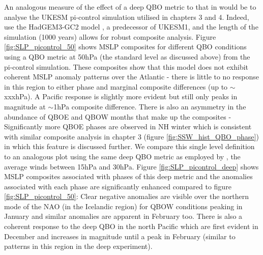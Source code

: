 An analogous measure of the effect of a deep QBO metric to that in \cite{andrewsObserved2019d} would be to analyse the UKESM pi-control simulation utilised in chapters 3 and 4. Indeed, \cite{andrewsObserved2019d} use the HadGEM3-GC2 model \citep{williamsMet2018b}, a predecessor of UKESM1, and the length of the simulation (1000 years) allows for robust composite analysis. Figure \ref{fig:SLP_picontrol_50} shows MSLP composites for different QBO conditions using a QBO metric at 50hPa (the standard level as discussed above) from the pi-control simulation. These composites show that this model does not exhibit coherent MSLP anomaly patterns over the Atlantic - there is little to no response in this region to either phase and marginal composite differences (up to $\sim$xxxhPa). A Pacific response is slightly more evident but still only peaks in magnitude at $\sim$1hPa composite difference. There is also an asymmetry in the abundance of QBOE and QBOW months that make up the composites - Significantly more QBOE phases are observed in NH winter which is consistent with similar composite analysis in chapter 3 (figure \ref{fig:SSW_hist_QBO_phase}) in which this feature is discussed further. We compare this single level definition to an analogous plot using the same deep QBO metric as employed by \cite{andrewsObserved2019d}, the average winds between 15hPa and 30hPa. Figure \ref{fig:SLP_picontrol_deep} shows MSLP composites associated with phases of this deep metric and the anomalies associated with each phase are significantly enhanced compared to figure \ref{fig:SLP_picontrol_50}: Clear negative anomalies are visible over the northern mode of the NAO (in the Icelandic region) for QBOW conditions peaking in January and similar anomalies are apparent in February too. There is also a coherent response to the deep QBO in the north Pacific which are first evident in December and increases in magnitude until a peak in February (similar to patterns in this region in the deep experiment). 


